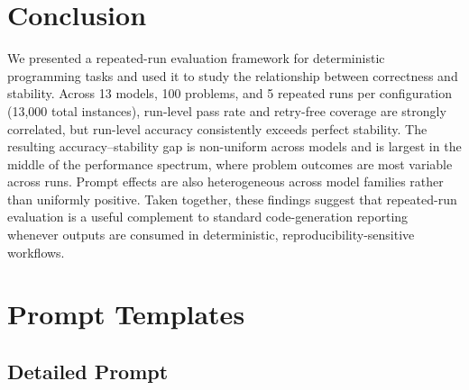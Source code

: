 \documentclass[11pt]{article}
\begin{document}
\section{Conclusion}

We presented a repeated-run evaluation framework for deterministic programming tasks and used it to study the relationship between correctness and stability. Across 13 models, 100 problems, and 5 repeated runs per configuration (13{,}000 total instances), run-level pass rate and retry-free coverage are strongly correlated, but run-level accuracy consistently exceeds perfect stability. The resulting accuracy--stability gap is non-uniform across models and is largest in the middle of the performance spectrum, where problem outcomes are most variable across runs. Prompt effects are also heterogeneous across model families rather than uniformly positive. Taken together, these findings suggest that repeated-run evaluation is a useful complement to standard code-generation reporting whenever outputs are consumed in deterministic, reproducibility-sensitive workflows.



\appendix

\section{Prompt Templates}

\subsection{Detailed Prompt}
\end{document}
